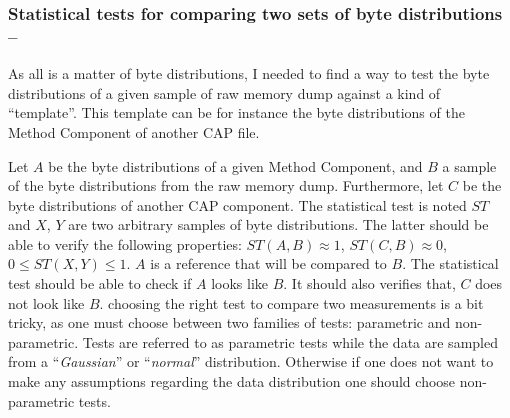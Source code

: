 

\subsubsection{Statistical tests for comparing two sets of byte distributions --}
As all is a matter of byte distributions, I needed to find a way to test the byte distributions of a
given sample of raw memory dump against a kind of ``template''. This template can be for instance the byte
distributions of the Method Component of another CAP file.

Let $A$ be the byte distributions of a given Method Component, and $B$ a sample of the byte
distributions from the raw memory dump. Furthermore, let $C$ be the byte distributions of another
CAP component. The statistical test is noted $ST$ and $X$, $Y$ are two arbitrary samples of byte
distributions.  The latter should be able to verify the following properties: $ST(A,B) \approx 1$,
$ST(C,B) \approx 0$, $0 \leq ST(X,Y) \leq 1$.
$A$ is a reference that will be compared to $B$. The statistical test should be able to check if $A$
looks like $B$. It should also verifies that, $C$ does not look like $B$.  
choosing the right test to compare two measurements is a bit tricky, as one must choose between two
families of tests: parametric and non-parametric.
Tests are referred to as parametric tests while the data are sampled from a ``\textit{Gaussian}'' or
``\textit{normal}'' distribution. Otherwise if one does not want to make any assumptions regarding
the data distribution one should choose non-parametric tests. 

